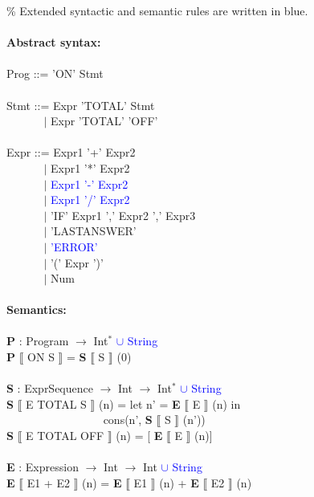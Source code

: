 \% Extended syntactic and semantic rules are written in blue.\\ \\
\textbf{Abstract syntax:} \\ \\
Prog ::= 'ON' Stmt \\ \\
Stmt ::= Expr 'TOTAL' Stmt \\ 
$~~~~~~~~~~~~~~~|$ Expr 'TOTAL' 'OFF' \\ \\
Expr ::= Expr1 '+' Expr2 \\
$~~~~~~~~~~~~~~~|$ Expr1 '*' Expr2 \\
$~~~~~~~~~~~~~~~|$ \textcolor{blue}{Expr1 '-' Expr2} \\
$~~~~~~~~~~~~~~~|$ \textcolor{blue}{Expr1 '/' Expr2} \\
$~~~~~~~~~~~~~~~|$ 'IF' Expr1 ',' Expr2 ',' Expr3 \\
$~~~~~~~~~~~~~~~|$ 'LASTANSWER' \\
$~~~~~~~~~~~~~~~|$ \textcolor{blue}{'ERROR'} \\
$~~~~~~~~~~~~~~~|$ '(' Expr ')' \\
$~~~~~~~~~~~~~~~|$ Num \\ \\
\textbf{Semantics:} \\ \\
\textbf{P} : Program $\rightarrow$ Int$^{*}$ \textcolor{blue}{$\cup$ String} \\
\textbf{P} $\llbracket$ ON S $\rrbracket$ = \textbf{S} $\llbracket$ S $\rrbracket$ (0) \\ \\
\textbf{S} : ExprSequence $\rightarrow$ Int $\rightarrow$ Int$^{*}$  \textcolor{blue}{$\cup$ String} \\
\textbf{S} $\llbracket$ E TOTAL S $\rrbracket$ (n) = let n' = \textbf{E} $\llbracket$ E $\rrbracket$ (n) in \\
$~~~~~~~~~~~~~~~~~~~~~~~~~~~~~~~~~~~~~~~$cons(n', \textbf{S} $\llbracket$ S $\rrbracket$ (n')) \\
\textbf{S} $\llbracket$ E TOTAL OFF $\rrbracket$ (n) = [ \textbf{E}  $\llbracket$ E $\rrbracket$ (n)] \\ \\
\textbf{E} : Expression $\rightarrow$ Int $\rightarrow$ Int \textcolor{blue}{$\cup$ String} \\ 
\textbf{E} $\llbracket$ E1 + E2 $\rrbracket$ (n) = \textbf{E} $\llbracket$ E1 $\rrbracket$ (n) + \textbf{E} $\llbracket$ E2 $\rrbracket$ (n) \\
